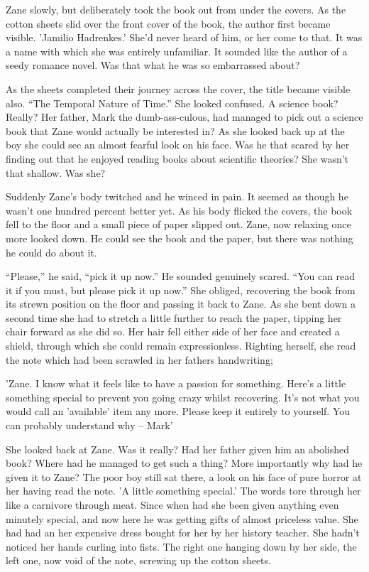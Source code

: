 Zane slowly, but deliberately took the book out from under the covers.  As the cotton sheets slid over the front cover of the book, the author first became visible.  'Jamilio Hadrenkes.'  She'd never heard of him, or her come to that.  It was a name with which she was entirely unfamiliar.  It sounded like the author of a seedy romance novel.  Was that what he was so embarrassed about?

As the sheets completed their journey across the cover, the title became visible also.  ``The Temporal Nature of Time.''  She looked confused.  A science book?  Really?  Her father, Mark the dumb-ass-culous, had managed to pick out a science book that Zane would actually be interested in?  As she looked back up at the boy she could see an almost fearful look on his face.  Was he that scared by her finding out that he enjoyed reading books about scientific theories?  She wasn't that shallow.  Was she?

Suddenly Zane's body twitched and he winced in pain.  It seemed as though he wasn't one hundred percent better yet.  As his body flicked the covers, the book fell to the floor and a small piece of paper slipped out.  Zane, now relaxing once more looked down.  He could see the book and the paper, but there was nothing he could do about it.

``Please,'' he said, ``pick it up now.''  He sounded genuinely scared.  ``You can read it if you must, but please pick it up now.''  She obliged, recovering the book from its strewn position on the floor and passing it back to Zane.  As she bent down a second time she had to stretch a little further to reach the paper, tipping her chair forward as she did so.  Her hair fell either side of her face and created a shield, through which she could remain expressionless.  Righting herself, she read the note which had been scrawled in her fathers handwriting;



'Zane.  I know what it feels like to have a passion for something.  Here's a little something special to prevent you going crazy whilst recovering.  It's not what you would call an 'available' item any more.  Please keep it entirely to yourself.  You can probably understand why – Mark'



She looked back at Zane.  Was it really?  Had her father given him an abolished book?  Where had he managed to get such a thing?  More importantly why had he given it to Zane?  The poor boy still sat there, a look on his face of pure horror at her having read the note.  'A little something special.'  The words tore through her like a carnivore through meat.  Since when had she been given anything even minutely special, and now here he was getting gifts of almost priceless value.  She had had an her expensive dress bought for her by her history teacher.  She hadn't noticed her hands curling into fists.  The right one hanging down by her side, the left one, now void of the note, screwing up the cotton sheets.

